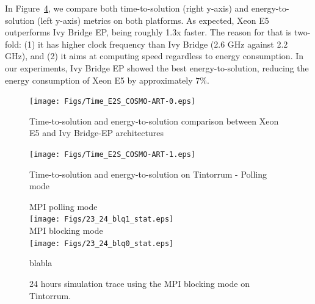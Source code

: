 In Figure~\ref{fig:3}, we compare both time-to-solution (right y-axis)
and  energy-to-solution (left  y-axis) metrics  on both  platforms. As
expected,  Xeon  E5 outperforms  Ivy  Bridge  EP,  being roughly  1.3x
faster.   The reason for  that is  two-fold: (1)  it has  higher clock
frequency than Ivy  Bridge (2.6 GHz against 2.2 GHz),  and (2) it aims
at  computing   speed  regardless   to  energy  consumption.   In  our
experiments,  Ivy  Bridge   EP  showed  the  best  energy-to-solution,
reducing the energy consumption of Xeon E5 by approximately $7\%$.

\begin{figure}[htbf]
  \texttt{[image: Figs/Time\_E2S\_COSMO-ART-0.eps]}
  \caption{Time-to-solution and energy-to-solution comparison between
    Xeon E5 and Ivy Bridge-EP architectures}
  \label{fig:3}
\end{figure}

\begin{figure}[htbf]
  \texttt{[image: Figs/Time\_E2S\_COSMO-ART-1.eps]}
  \caption{Time-to-solution and energy-to-solution on Tintorrum -
    Polling mode}
  \label{fig:3}
\end{figure}

\begin{figure}[htbf]
  \centering
  \scriptsize
  MPI polling mode\\
  \texttt{[image: Figs/23\_24\_blq1\_stat.eps]}\\
  MPI blocking mode\\
  \texttt{[image: Figs/23\_24\_blq0\_stat.eps]}\\
  \caption{blabla}
  \label{fig:3}
\end{figure}


\begin{figure}[htbf]
  \centering\hspace{0.5cm}
  \scalebox{0.5}{}
  \caption{24 hours simulation trace using the MPI blocking mode on Tintorrum.}
  \label{fig:3}
\end{figure}

